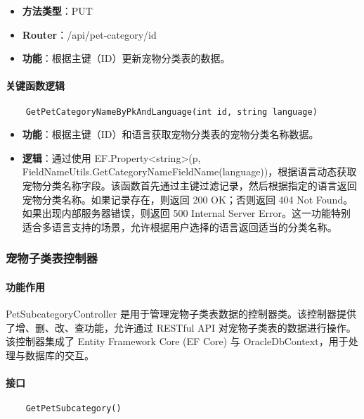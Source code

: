 \begin{itemize}
	\item \textbf{方法类型}：PUT
	\item \textbf{Router}：/api/pet-category/{id}
	\item \textbf{功能}：根据主键（ID）更新宠物分类表的数据。
\end{itemize}

\paragraph{关键函数逻辑}

\begin{verbatim}
	GetPetCategoryNameByPkAndLanguage(int id, string language)
\end{verbatim}

\begin{itemize}
	\item \textbf{功能}：根据主键（ID）和语言获取宠物分类表的宠物分类名称数据。
	\item \textbf{逻辑}：通过使用 EF.Property<string>(p, FieldNameUtils.GetCategoryNameFieldName(language))，根据语言动态获取宠物分类名称字段。该函数首先通过主键过滤记录，然后根据指定的语言返回宠物分类名称。如果记录存在，则返回 200 OK；否则返回 404 Not Found。如果出现内部服务器错误，则返回 500 Internal Server Error。这一功能特别适合多语言支持的场景，允许根据用户选择的语言返回适当的分类名称。
\end{itemize}

\subsubsection{宠物子类表控制器}

\paragraph{功能作用}

PetSubcategoryController 是用于管理宠物子类表数据的控制器类。该控制器提供了增、删、改、查功能，允许通过 RESTful API 对宠物子类表的数据进行操作。该控制器集成了 Entity Framework Core (EF Core) 与 OracleDbContext，用于处理与数据库的交互。

\paragraph{接口}

\begin{verbatim}
	GetPetSubcategory()
\end{verbatim}

